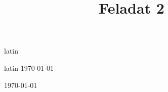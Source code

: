 \documentclass[]{article}
\begin{document}
\title{Feladat 2}
\maketitle

\begin{otherlanguage*}{latin}
\frenchspacing
\setlength{\parskip}{12pt}\noindent \lipsum[1]
\end{otherlanguage*}{latin}
\today
\begin{flushright}

\hulipsum[1]

\end{flushright}


\today

\begin{doublespace}
\blindtext[1]
\end{doublespace}
\end{document}
